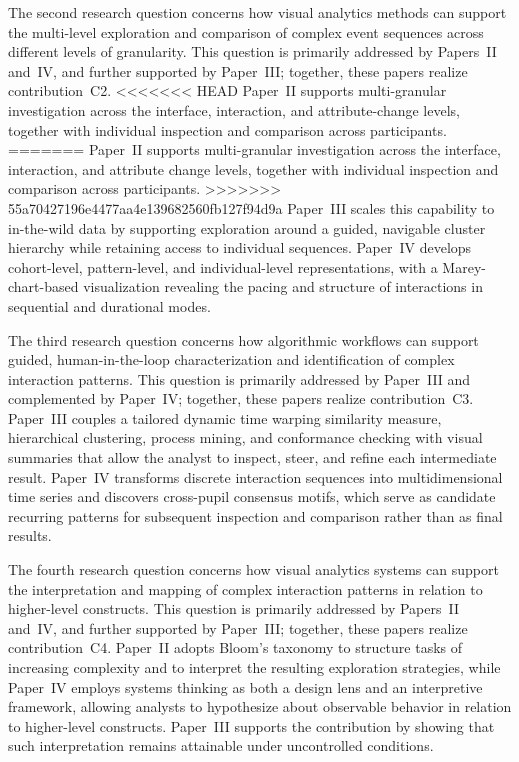 The second research question concerns how visual analytics methods can support the multi-level exploration and comparison of complex event sequences across different levels of granularity.
This question is primarily addressed by Papers~II and~IV, and further supported by Paper~III; together, these papers realize contribution~C2.
<<<<<<< HEAD
Paper~II supports multi-granular investigation across the interface, interaction, and attribute-change levels, together with individual inspection and comparison across participants.
=======
Paper~II supports multi-granular investigation across the interface, interaction, and attribute change levels, together with individual inspection and comparison across participants.
>>>>>>> 55a70427196e4477aa4e139682560fb127f94d9a
Paper~III scales this capability to in-the-wild data by supporting exploration around a guided, navigable cluster hierarchy while retaining access to individual sequences.
Paper~IV develops cohort-level, pattern-level, and individual-level representations, with a Marey-chart-based visualization revealing the pacing and structure of interactions in sequential and durational modes.

The third research question concerns how algorithmic workflows can support guided, human-in-the-loop characterization and identification of complex interaction patterns.
This question is primarily addressed by Paper~III and complemented by Paper~IV; together, these papers realize contribution~C3.
Paper~III couples a tailored dynamic time warping similarity measure, hierarchical clustering, process mining, and conformance checking with visual summaries that allow the analyst to inspect, steer, and refine each intermediate result.
Paper~IV transforms discrete interaction sequences into multidimensional time series and discovers cross-pupil consensus motifs, which serve as candidate recurring patterns for subsequent inspection and comparison rather than as final results.

The fourth research question concerns how visual analytics systems can support the interpretation and mapping of complex interaction patterns in relation to higher-level constructs.
This question is primarily addressed by Papers~II and~IV, and further supported by Paper~III; together, these papers realize contribution~C4.
Paper~II adopts Bloom's taxonomy to structure tasks of increasing complexity and to interpret the resulting exploration strategies, while Paper~IV employs systems thinking as both a design lens and an interpretive framework, allowing analysts to hypothesize about observable behavior in relation to higher-level constructs.
Paper~III supports the contribution by showing that such interpretation remains attainable under uncontrolled conditions.

